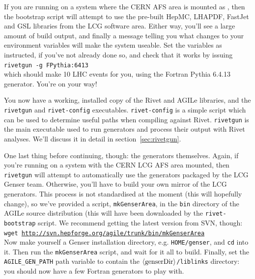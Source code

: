 \documentclass{JHEP3}
\newcommand{\kbd}[1]{\texttt{#1}\xspace}
\newcommand{\inp}[1]{\textsf{\textdollar}\hspace{1mm}\texttt{#1}\xspace}
\newcommand{\var}[1]{\texttt{\textdollar{}#1}\xspace}
\newcommand{\val}[1]{\textit{\ensuremath{\langle\text{\textrm{#1}\/}\rangle}}\xspace}
\newcommand{\SectionRef}[1]{section~\ref{#1}}
\begin{document}
If you are running on a system where the CERN AFS area is mounted as
, then the bootstrap script will attempt to use the pre-built
HepMC, LHAPDF, FastJet and GSL libraries from the LCG software area. Either way,
you'll see a large amount of build output, and finally a message telling you
what changes to your environment variables will make the system useable. Set the
variables as instructed, if you've not already done so, and check that it works
by issuing\\
\inp{rivetgun -g FPythia:6413}\\
which should make 10 LHC events for you, using the Fortran Pythia 6.4.13
generator. You're on your way!

You now have a working, installed copy of the Rivet and AGILe libraries, and the
\kbd{rivetgun} and \kbd{rivet-config} executables. \kbd{rivet-config} is a
simple script which can be used to determine useful paths when compiling against
Rivet. \kbd{rivetgun} is the main executable used to run generators and process
their output with Rivet analyses. We'll discuss it in detail
in \SectionRef{sec:rivetgun}.

One last thing before continuing, though: the generators themselves. Again, if
you're running on a system with the CERN LCG AFS area mounted, then
\kbd{rivetgun} will attempt to automatically use the generators packaged by the
LCG Genser team. Otherwise, you'll have to build your own mirror of the LCG
generators. This process is not standardised at the moment (this will hopefully
change), so we've provided a script, \kbd{mkGenserArea}, in the \kbd{bin}
directory of the AGILe source distribution (this will have been downloaded by
the \kbd{rivet-bootstrap} script. We recommend getting the latest version from
SVN, though:\\
\inp{wget \url{http://svn.hepforge.org/agile/trunk/bin/mkGenserArea}}\\
Now make yourself a Genser installation directory, e.g. \kbd{\var{HOME}/genser},
and \kbd{cd} into it. Then run the \kbd{mkGenserArea} script, and wait for it
all to build. Finally, set the \var{AGILE_GEN_PATH} path variable to contain the
\kbd{\val{genserDir}/liblinks} directory: you should now have a few Fortran
generators to play with.
\end{document}
